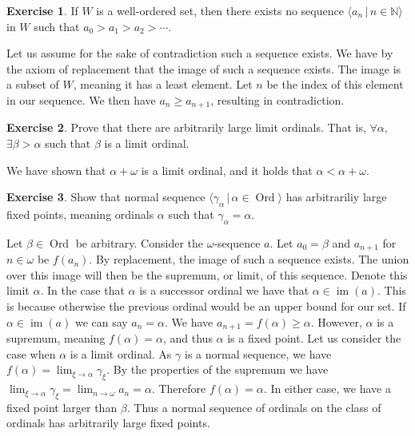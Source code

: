 \documentclass{article}
\theoremstyle{definition}
\newtheorem{exer}{Exercise}[section]
\newcommand{\N}{\mathbb{N}}
\DeclareMathOperator{\im}{im}
\DeclareMathOperator{\Ord}{Ord}
\newlength{\defparindent}
\newenvironment{answer}
    {\begin{mdframed}[backgroundcolor=gray!15, linewidth=0pt] \setlength{\parindent}{\defparindent}}
    {\end{mdframed}}
\begin{document}
\begin{exer}
    If $W$ is a well-ordered set, then there exists no sequence $\langle a_n \, | \, n \in \N \rangle$ in $W$ such that $a_0 > a_1 > a_2 > \cdots$.
    \begin{answer}
        Let us assume for the sake of contradiction such a sequence exists. We have by the axiom of replacement that the image of such a sequence exists. The image is a subset of $W$, meaning it has a least element. Let $n$ be the index of this element in our sequence. We then have $a_n \ge a_{n + 1}$, resulting in contradiction.
    \end{answer}
\end{exer}

\begin{exer}
    Prove that there are arbitrarily large limit ordinals. That is, $\forall \alpha$, $\exists \beta > \alpha$ such that $\beta$ is a limit ordinal. 
    \begin{answer}
        We have shown that $\alpha + \omega$ is a limit ordinal, and it holds that $\alpha < \alpha + \omega$.
    \end{answer}
\end{exer}

\begin{exer}
    Show that normal sequence $\langle \gamma_\alpha \, | \, \alpha \in \Ord \rangle$ has arbitrariliy large fixed points, meaning ordinals $\alpha$ such that $\gamma_\alpha = \alpha$.
    \begin{answer}
        Let $\beta \in \Ord$ be arbitrary. Consider the $\omega$-sequence $a$. Let $a_0 = \beta$ and $a_{n + 1}$ for $n \in \omega$ be $f(a_{n})$. By replacement, the image of such a sequence exists. The union over this image will then be the supremum, or limit, of this sequence. Denote this limit $\alpha$. In the case that $\alpha$ is a successor ordinal we have that $\alpha \in \im(a)$. This is because otherwise the previous ordinal would be an upper bound for our set. If $\alpha \in \im(a)$ we can say $a_n = \alpha$. We have $a_{n + 1} = f(\alpha) \ge \alpha$. However, $\alpha$ is a supremum, meaning $f(\alpha) = \alpha$, and thus $\alpha$ is a fixed point. Let us consider the case when $\alpha$ is a limit ordinal. As $\gamma$ is a normal sequence, we have $f(\alpha) = \lim_{\xi \to \alpha} \gamma_\xi$. By the properties of the supremum we have $\lim_{\xi \to \alpha} \gamma_\xi = \lim_{n \to \omega} a_n = \alpha$. Therefore $f(\alpha) = \alpha$. In either case, we have a fixed point larger than $\beta$. Thus a normal sequence of ordinals on the class of ordinals has arbitrarily large fixed points.
    \end{answer}
\end{exer}
\end{document}
